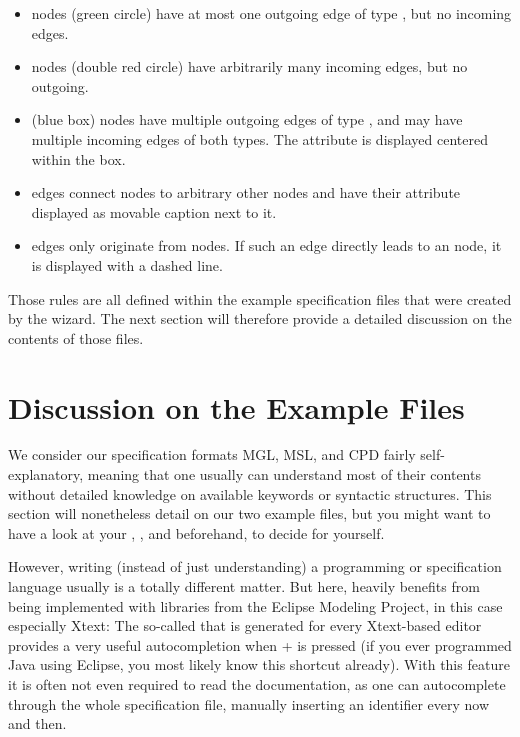 \documentclass[a4paper,american,12pt]{scrreprt}
\begin{document}
\begin{itemize}
\item {} nodes (green circle) have at most one outgoing edge of type
	, but no incoming edges.
\item {} nodes (double red circle) have arbitrarily many incoming edges,
	but no outgoing.
\item {} (blue box) nodes have multiple outgoing edges of type
	, and may have multiple incoming edges of both types.
	The attribute  is displayed centered within the box.
\item {} edges connect  nodes to arbitrary other nodes and
	have their attribute  displayed as movable caption next to it.
\item {} edges only originate from  nodes. If such an
	edge directly leads to an  node, it is displayed with a dashed
	line.
\end{itemize}

Those rules are all defined within the example \cinco specification files that
were created by the wizard. The next section will therefore provide a detailed
discussion on the contents of those files.

\section{Discussion on the Example Files}
\label{sec:examplefiles}

We consider our specification formats MGL, MSL, and CPD fairly self-explanatory,
meaning that one usually can understand most of their contents without detailed
knowledge on available keywords or syntactic structures. This section
will nonetheless detail on our two example files, but you might want to have a look at
your , , and  beforehand, to decide for
yourself. 

However, writing (instead of just understanding) a programming or specification language usually is a totally
different matter. But here, \cinco heavily benefits from being implemented
with libraries from the Eclipse Modeling Project, in this case especially Xtext:
The so-called  that is generated for every Xtext-based
editor provides a very useful autocompletion when
+ is pressed (if you ever programmed Java using
Eclipse, you most likely know this shortcut already). With this feature it is
often not even required to read the documentation, as one can autocomplete
through the whole specification file, manually inserting an identifier every now and
then.
\end{document}
